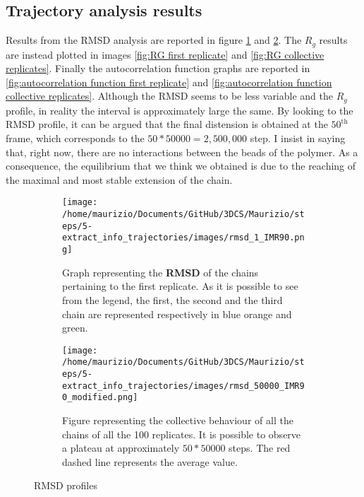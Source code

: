 \subsection{Trajectory analysis results}

Results from the RMSD analysis are reported in figure \ref{fig:RMSD first replicate} and \ref{fig:RMSD collective replicates}. The $R_g$ results are instead plotted in images \ref{fig:RG first replicate} and \ref{fig:RG collective replicates}. Finally the autocorrelation function graphs are reported in \ref{fig:autocorrelation function first replicate} and \ref{fig:autocorrelation function collective replicates}. Although the RMSD seems to be less variable and the $R_g$ profile, in reality the interval is approximately large the same. By looking to the RMSD profile, it can be argued that the final distension is obtained at the $50^{\text{th}}$ frame, which corresponds to the $50 * 50000 = 2,500,000$ step. I insist in saying that, right now, there are no interactions between the beads of the polymer. As a consequence, the equilibrium that we think we obtained is due to the reaching of the maximal and most stable extension of the chain. 


\begin{figure}[H]
    \centering
    
    \begin{subfigure}{0.49\textwidth}
      \texttt{[image: /home/maurizio/Documents/GitHub/3DCS/Maurizio/steps/5-extract\_info\_trajectories/images/rmsd\_1\_IMR90.png]}
      \caption{Graph representing the \textbf{RMSD} of the chains pertaining to the first replicate. As it is possible to see from the legend, the first, the second and the third chain are represented respectively in blue orange and green.}
      \label{fig:RMSD first replicate}
    \end{subfigure}
    \hfill
    \begin{subfigure}{0.49\textwidth}
      \texttt{[image: /home/maurizio/Documents/GitHub/3DCS/Maurizio/steps/5-extract\_info\_trajectories/images/rmsd\_50000\_IMR90\_modified.png]}
      \caption{Figure representing the collective behaviour of all the chains of all the 100 replicates. It is possible to observe a plateau at approximately $50*50000$ steps. The red dashed line represents the average value.}
      \label{fig:RMSD collective replicates}
    \end{subfigure}
  
    \caption{RMSD profiles}
    \label{fig:RMSD figures}
\end{figure}


